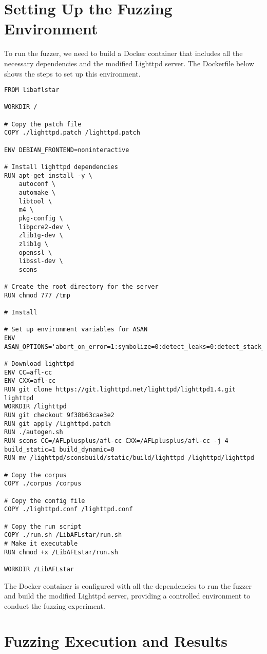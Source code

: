\section{Setting Up the Fuzzing Environment}

To run the fuzzer, we need to build a Docker container that includes all the necessary dependencies and the modified Lighttpd server. The Dockerfile below shows the steps to set up this environment.

\begin{lstlisting}
FROM libaflstar 

WORKDIR /

# Copy the patch file
COPY ./lighttpd.patch /lighttpd.patch

ENV DEBIAN_FRONTEND=noninteractive

# Install lighttpd dependencies
RUN apt-get install -y \
    autoconf \
    automake \
    libtool \
    m4 \
    pkg-config \
    libpcre2-dev \
    zlib1g-dev \
    zlib1g \
    openssl \
    libssl-dev \
    scons

# Create the root directory for the server
RUN chmod 777 /tmp

# Install

# Set up environment variables for ASAN
ENV ASAN_OPTIONS='abort_on_error=1:symbolize=0:detect_leaks=0:detect_stack_use_after_return=1:detect_container_overflow=0:poison_array_cookie=0:malloc_fill_byte=0:max_malloc_fill_size=16777216'

# Download lighttpd
ENV CC=afl-cc
ENV CXX=afl-cc
RUN git clone https://git.lighttpd.net/lighttpd/lighttpd1.4.git lighttpd
WORKDIR /lighttpd 
RUN git checkout 9f38b63cae3e2
RUN git apply /lighttpd.patch
RUN ./autogen.sh  
RUN scons CC=/AFLplusplus/afl-cc CXX=/AFLplusplus/afl-cc -j 4 build_static=1 build_dynamic=0
RUN mv /lighttpd/sconsbuild/static/build/lighttpd /lighttpd/lighttpd

# Copy the corpus
COPY ./corpus /corpus

# Copy the config file
COPY ./lighttpd.conf /lighttpd.conf

# Copy the run script
COPY ./run.sh /LibAFLstar/run.sh
# Make it executable
RUN chmod +x /LibAFLstar/run.sh

WORKDIR /LibAFLstar
\end{lstlisting}
The Docker container is configured with all the dependencies to run the fuzzer and build the modified Lighttpd server, providing a controlled environment to conduct the fuzzing experiment.

\section{Fuzzing Execution and Results}


